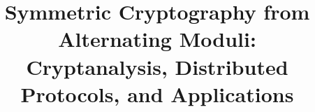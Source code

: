 \documentclass[11pt]{article}
\begin{document}
\title{Symmetric Cryptography from Alternating Moduli: \\Cryptanalysis, Distributed Protocols, and Applications }
\author{}
\date{}

\maketitle


\end{document}

